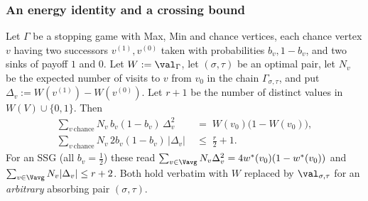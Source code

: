 \subsubsection*{An energy identity and a crossing bound}

\begin{theorem}\label{thm:fs16-cross}
Let $\Gamma$ be a stopping game with Max, Min and chance vertices, each chance
vertex $v$ having two successors $v^{(1)},v^{(0)}$ taken with probabilities
$b_v,1-b_v$, and two sinks of payoff $1$ and $0$. Let $W:=\val_\Gamma$, let
$(\sigma,\tau)$ be an optimal pair, let $N_v$ be the expected number of visits
to $v$ from $v_0$ in the chain $\Gamma_{\sigma,\tau}$, and put
$\Delta_v:=W(v^{(1)})-W(v^{(0)})$. Let $r+1$ be the number of distinct values
in $W(V)\cup\{0,1\}$. Then
\begin{align}
  \sum_{v\ \mathrm{chance}} N_v\,b_v(1-b_v)\,\Delta_v^{2}
  &\;=\;W(v_0)\bigl(1-W(v_0)\bigr), \label{eq:fs16-energy}\\
  \sum_{v\ \mathrm{chance}} N_v\,2b_v(1-b_v)\,|\Delta_v|
  &\;\le\;\tfrac{r}{2}+1. \label{eq:fs16-cross}
\end{align}
For an SSG (all $b_v=\tfrac12$) these read
$\sum_{v\in\Vavg}N_v\Delta_v^{2}=4w^\ast(v_0)(1-w^\ast(v_0))$ and
$\sum_{v\in\Vavg}N_v|\Delta_v|\le r+2$. Both hold verbatim with $W$ replaced by
$\val_{\sigma,\tau}$ for an \emph{arbitrary} absorbing pair $(\sigma,\tau)$.
\end{theorem}

